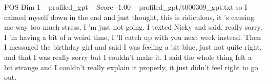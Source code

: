 \begin{textsample}{POS Dim 1 – profiled\_gpt – Score -1.00 – profiled\_gpt/t000309\_gpt.txt}  \label{ex:f1_pos_032}
so I calmed myself down in the end and just thought, this is ridiculous, it 's causing me way too much stress, I 'm just not going.
I texted Nicky and said, really sorry, I 'm having a bit of a weird time, I ’ll catch up with you next week instead.
Then I messaged the birthday girl and said I was feeling a bit blue, just not quite right, and that I was really sorry but I couldn't make it.
I said the whole thing felt a bit strange and I couldn't really explain it properly, it just didn't feel right to go out.

\end{textsample}
